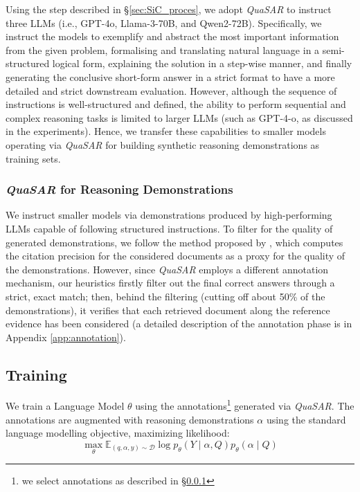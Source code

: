 \documentclass[11pt]{article}
\newcommand{\QuaSAR}{\emph{QuaSAR}\xspace}
\begin{document}
Using the step described in \S \ref{sec:SiC_proces}, we adopt \QuaSAR to instruct three LLMs (i.e., GPT-4o, Llama-3-70B, and Qwen2-72B). Specifically, we instruct the models to exemplify and abstract the most important information from the given problem, formalising and translating natural language in a semi-structured logical form, explaining the solution in a step-wise manner, and finally generating the conclusive short-form answer in a strict format to have a more detailed and strict downstream evaluation. 
However, although the sequence of instructions is well-structured and defined, the ability to perform sequential and complex reasoning tasks is limited to larger LLMs (such as GPT-4-o, as discussed in the experiments). Hence, we transfer these capabilities to smaller models operating via \QuaSAR for building synthetic reasoning demonstrations as training sets.

\subsubsection{\QuaSAR for Reasoning Demonstrations}
\label{sec:annotation_strategy}
We instruct smaller models via demonstrations produced by high-performing LLMs capable of following structured instructions. 
To filter for the quality of generated demonstrations, we follow the method proposed by \citet{ranaldi2024eliciting}, which computes the citation precision for the considered documents as a proxy for the quality of the demonstrations. However, since \QuaSAR employs a different annotation mechanism, our heuristics firstly filter out the final correct answers through a strict, exact match; then, behind the filtering (cutting off about 50\% of the demonstrations), it verifies that each retrieved document along the reference evidence has been considered (a detailed description of the annotation phase is in Appendix \ref{app:annotation}).

\subsection{Training}
\label{sec:tuning}
We train a Language Model $\theta$ using the annotations\footnote{we select annotations as described in \S \ref{sec:annotation_strategy}} generated via \QuaSAR. The annotations are augmented with reasoning demonstrations $\alpha$ using the standard language modelling objective, maximizing likelihood:
\begin{equation}\label{eq:likehood}
\max _{\theta} \mathbb{E}_{(q, \alpha, y) \sim \mathcal{D}} \log p_{\theta}(Y \mid \alpha, Q) p_{\theta}({\alpha \mid Q})
\end{equation}
\end{document}

